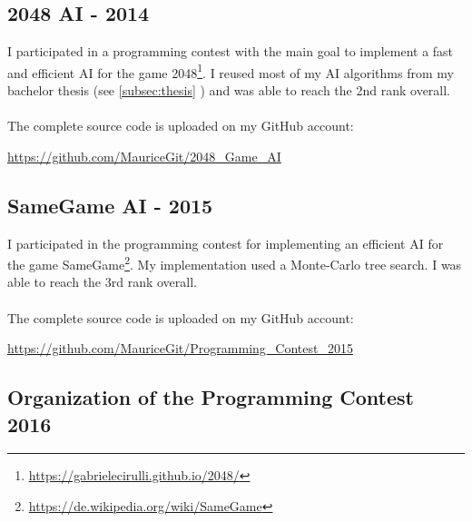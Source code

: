 \documentclass[a4paper, 12pt]{article}
\begin{document}
\subsection{2048 AI - 2014}

I participated in a programming contest with the main goal to implement a fast and efficient AI for the game
2048\footnote{\url{https://gabrielecirulli.github.io/2048/}}. I reused most of my AI algorithms from my bachelor 
thesis (see \ref{subsec:thesis} \glqq{}\grqq) and was able to reach the 2nd rank overall.
\\
\\
The complete source code is uploaded on my GitHub account:

\begin{center}
	\url{https://github.com/MauriceGit/2048_Game_AI}
\end{center}

\subsection{SameGame AI - 2015}

I participated in the programming contest for implementing an efficient AI for the game
SameGame\footnote{\url{https://de.wikipedia.org/wiki/SameGame}}. My implementation used a Monte-Carlo tree 
search. I was able to reach the 3rd rank overall.
\\
\\
The complete source code is uploaded on my GitHub account:

\begin{center}
	\url{https://github.com/MauriceGit/Programming_Contest_2015}
\end{center}


\subsection{Organization of the Programming Contest 2016}
\end{document}
